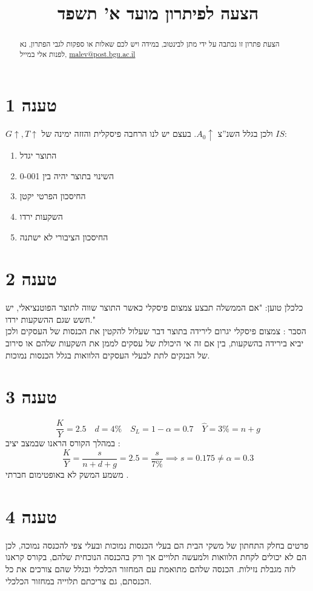 \documentclass[12pt]{article}
\title{הצעה לפיתרון מועד א' תשפד} %
\renewcommand{\qed}{\hfill\blacksquare}
\begin{document}
\date{}
\maketitle
\begin{abstract}
    הצעת פתרון זו נכתבה על ידי מתן לבינטוב, במידה ויש לכם שאלות או ספקות לגבי הפתרון, נא לפנות אלי במייל, \href{mailto:malev@post.bgu.ac.il}{\textenglish{malev@post.bgu.ac.il}}
\end{abstract}

\section*{טענה 1}
$G\uparrow,T\uparrow$ ולכן בגלל השנ''צ $A_0\uparrow$. בעצם יש לנו הרחבה פיסקלית והזזה ימינה של $IS$:
\begin{enumerate}
    \item התוצר יגדל
    \item השינוי בתוצר יהיה בין 0-001
    \item החיסכון הפרטי יקטן
    \item השקעות ירדו
    \item החיסכון הציבורי לא ישתנה
\end{enumerate}
\section*{טענה 2}
כלכלן טוען: "אם הממשלה  תבצע צמצום פיסקלי כאשר התוצר שווה לתוצר הפוטנציאלי, יש חשש שגם ההשקעות ירדו." \\
הסבר : צמצום פיסקלי יגרום לירידה בתוצר דבר שעלול להקטין את הכנסות של העסקים ולכן יביא בירידה בהשקעות, בין אם זה אי היכולת של עסקים לממן את השקעות שלהם או סירוב של הבנקים לתת לבעלי העסקים הלוואות בגלל הכנסות נמוכות.
\section*{טענה 3}
\begin{equation*}
    \frac{K}{Y} = 2.5 \quad d = 4\% \quad S_L = 1-\alpha = 0.7 \quad  \widehat Y = 3\% = n+g
\end{equation*}
במהלך הקורס הראנו שבמצב יציב :
\begin{equation*}
    \frac{K}{Y} = \frac{s}{n+d+g} = 2.5 = \frac{s}{7\%} \implies s = 0.175 \neq \alpha = 0.3
\end{equation*}
משמע המשק לא באופטימום חברתי .\qed
\section*{טענה 4}
 פרטים בחלק התחתון של משקי הבית הם בעלי הכנסות נמוכות ובעלי צפי להכנסה נמוכה, לכן הם לא יכולים לקחת הלוואות ולמעשה תלויים אך ורק בהכנסה הנוכחית שלהם, בקורס קראנו לזה מגבלת נזילות. הכנסה שלהם מתואמת עם המחזור הכלכלי ובגלל שהם צורכים את כל הכנסתם, גם צריכתם תלוייה במחזור הכלכלי.
\end{document}
